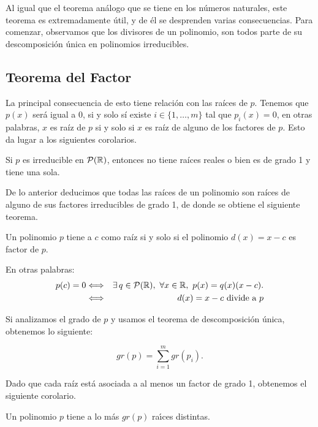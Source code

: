 Al igual que el teorema análogo que se tiene en los números naturales, este teorema es extremadamente útil, y de él se desprenden varias consecuencias.
Para comenzar, observamos que los divisores de un polinomio, son todos parte de su descomposición única en polinomios irreducibles.

\subsection{Teorema del Factor}

La principal consecuencia de esto tiene relación con las raíces de $p$. Tenemos que $p(x)$ será igual a 0, si y solo sí existe $i\in\{1,\dots,m\}$ tal que $p_i(x)=0$, en otras palabras, $x$ es raíz de $p$ si y solo si $x$ es raíz de alguno de los factores de $p$.
Esto da lugar a los siguientes corolarios.

\medskip

\begin{cor}
Si $p$ es irreducible en $\mathcal{P}(\mathbb{R})$, entonces  no tiene raíces reales o bien es de grado 1 y tiene una sola.
\end{cor}

De lo anterior deducimos que todas las raíces de un polinomio son raíces de alguno de sus factores irreducibles de grado 1, de donde se obtiene el siguiente teorema.

\medskip

\begin{thm}
Un polinomio $p$ tiene a $c$ como raíz si y solo si el polinomio $d(x)=x-c$ es factor de $p$.
\end{thm}

En otras palabras:
\begin{eqnarray*}
p(c)=0 &\Longleftrightarrow& \exists\, q\in  \mathcal{P}(\R),\ \forall x\in \R,\  p(x)=q(x)(x-c).\\
&\Longleftrightarrow&d(x)=x-c\textrm{ divide a } p
\end{eqnarray*}

Si analizamos el grado de $p$ y usamos el teorema de descomposición única, obtenemos lo siguiente:

$$ gr(p)=\sum_{i=1}^m gr(p_i).$$

Dado que cada raíz está asociada a al menos un factor de grado 1, obtenemos el siguiente corolario.

\medskip

\begin{cor}
Un polinomio $p$ tiene a lo m\'as $gr(p)$ ra{\'\i}ces distintas.
\end{cor}

